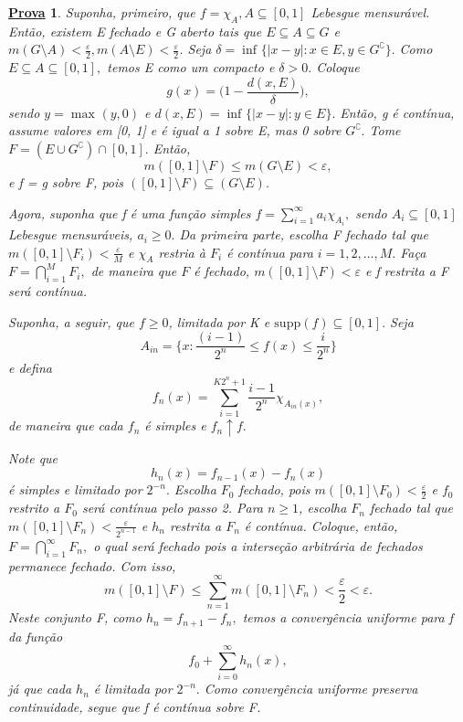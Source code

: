 \documentclass{article}
\newtheorem*{proof*}{\underline{Prova}}
\begin{document}
\begin{proof*}
  Suponha, primeiro, que \(f = \chi_{A}, A\subseteq [0, 1]\) Lebesgue mensurável. Então, existem E fechado e G aberto tais que \(E\subseteq A\subseteq G\) e \(m(G\setminus{A}) < \frac{\varepsilon }{2}, m(A\setminus{E}) < \frac{\varepsilon }{2}\). 
Seja \(\delta = \inf_{}\{|x-y|: x\in E, y\in G ^{\complement}\}.\) Como \(E\subseteq A\subseteq [0, 1],\) temos E como um compacto e \(\delta  > 0.\) Coloque 
  \[
    g(x) = \biggl(1 - \frac{d(x, E)}{\delta }\biggr),
  \]
sendo \(y = \max_{}(y, 0)\) e \(d(x, E) = \inf_{}\{|x-y|:y\in E\}.\) Então, g é contínua, assume valores em [0, 1] e é igual a 1 sobre E, mas 0 sobre \(G ^{\complement}.\) Tome 
 \(F = (E\cup G ^{\complement})\cap [0, 1].\) Então, 
   \[
     m([0, 1]\setminus{F}) \leq m(G\setminus{E}) < \varepsilon,
   \]
   e f = g sobre F, pois \(([0, 1]\setminus{F})\subseteq (G\setminus{E}).\)

   Agora, suponha que f é uma função simples \(f = \sum\limits_{i=1}^{\infty}a_{i}\chi_{A_{i}},\) sendo \(A_{i}\subseteq [0, 1]\) Lebesgue mensuráveis, \(a_{i} \geq 0.\) Da primeira parte, escolha 
   F fechado tal que \(m([0, 1]\setminus{F_{i}}) < \frac{\varepsilon }{M}\) e \(\chi_{A}\) restria à \(F_{i}\) é contínua para \(i=1,2,\dotsc , M.\) Faça \(F = \bigcap_{i=1}^{M}F_{i},\) de maneira que \(F\) é fechado, \(m([0,1]\setminus{F}) < \varepsilon \)
   e f restrita a F será contínua. 

   Suponha, a seguir, que \(f\geq 0\), limitada por K e \(\mathrm{supp}(f)\subseteq [0, 1].\) Seja 
     \[
       A_{in} = \biggl\{x: \frac{(i-1)}{2^{n}} \leq f(x) \leq \frac{i}{2^{n}}\biggr\}
     \]
     e defina 
       \[
         f_{n}(x) = \sum\limits_{i=1}^{K2^{n}+1}\frac{i-1}{2^{n}}\chi_{A_{in}(x)},
       \]
  de maneira que cada \(f_{n}\) é simples e \(f_{n}\uparrow f.\)

  Note que 
    \[
      h_{n}(x) = f_{n-1}(x) - f_{n}(x)
    \]
  é simples e limitado por \(2^{-n}.\) Escolha \(F_{0}\) fechado, pois \(m([0, 1]\setminus{F_{0}}) < \frac{\varepsilon }{2}\) e \(f_{0}\) restrito a \(F_{0}\) será contínua pelo passo 2. 
Para \(n\geq 1\), escolha \(F_{n}\) fechado tal que \(m([0, 1]\setminus{F_{n}}) < \frac{\varepsilon }{2^{n-1}}\) e \(h_{n}\) restrita a \(F_{n}\) é contínua. Coloque, então, \(F = \bigcap_{i=1}^{\infty}F_{n},\) o qual 
será fechado pois a interseção arbitrária de fechados permanece fechado. Com isso, 
  \[
    m([0,1]\setminus{F}) \leq \sum\limits_{n=1}^{\infty}m([0, 1]\setminus{F_{n}}) < \frac{\varepsilon }{2} < \varepsilon .
  \]
  Neste conjunto F, como \(h_{n} = f_{n+1}-f_{n},\) temos a convergência uniforme para f da função 
    \[
      f_{0} + \sum\limits_{i=0}^{\infty}h_{n}(x),
    \]
  já que cada \(h_{n}\) é limitada por \(2^{-n}.\) Como convergência uniforme preserva continuidade, segue que f é contínua sobre F. 


\end{proof*}
\end{document}
